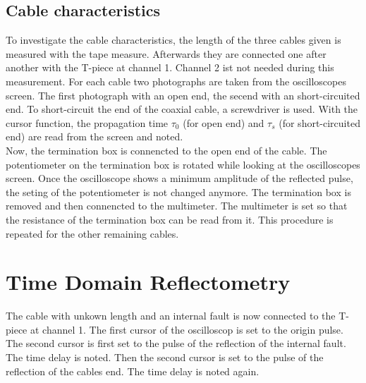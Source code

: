\subsection{Cable characteristics}
To investigate the cable characteristics, the length of the three cables given is measured with the tape measure.
Afterwards they are connected one after another with the T-piece at channel 1. Channel 2 ist not needed during this
measurement. For each cable two photographs are taken from the oscilloscopes screen. The first photograph with an open
end, the secend with an short-circuited end. To short-circuit the end of the coaxial cable, a screwdriver is used. With
the cursor function, the propagation time $\tau_0$ (for open end) and $\tau_s$ (for short-circuited end) are read from
the screen and noted.\\
Now, the termination box is connencted to the open end of the cable. The potentiometer on the termination box is rotated
while looking at the oscilloscopes screen. Once the oscilloscope shows a minimum amplitude of the reflected pulse, the
seting of the potentiometer is not changed anymore. The termination box is removed and then connencted to the multimeter.
The multimeter is set so that the resistance of the termination box can be read from it. This procedure is repeated for
the other remaining cables.
%
\section{Time Domain Reflectometry}
The cable with unkown length and an internal fault is now connected to the T-piece at channel 1. The first cursor of the
oscilloscop is set to the origin pulse. The second cursor is first set to the pulse of the reflection of the internal
fault. The time delay is noted. Then the second cursor is set to the pulse of the reflection of the cables end. The time
delay is noted again.
